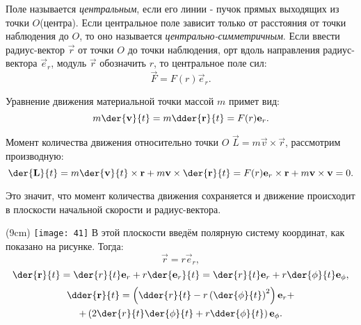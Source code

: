 

Поле называется \textit{центральным}, если его линии - пучок прямых выходящих
из точки \( O \)(центра). Если центральное поле зависит только от расстояния от
точки наблюдения до \( O \), то оно называется \textit{центрально-симметричным}.
Если ввести радиус-вектор \( \vec{r} \) от точки \( O \) до точки наблюдения,
орт вдоль направления радиус-вектора \( \vec{e}_r \), модуль \( \vec{r} \)
обозначить \( r \), то центральное поле сил:
\[
    \vec{F} = F(r)\vec{e}_{r}.
\]

Уравнение движения материальной точки массой \( m \) примет вид: 
\[
    m\der{\vec{v}}{t} = m\dder{\vec{r}}{t} = F(r)\vec{e}_{r}.
\]
    
Момент количества движения относительно точки \( O \)
\( \vec{L} = m \vec{v} \times \vec{r} \), рассмотрим производную:
\[
    \der{\vec{L}}{t} = 
    m \der{\vec{v}}{t} \times \vec{r} + m \vec{v} \times \der{\vec{r}}{t} =
    F(r)\vec{e}_{r} \times \vec{r} + m \vec{v} \times \vec{v} = 0.
\]
    
Это значит, что момент количества движения сохраняется и движение происходит в
плоскости начальной скорости и радиус-вектора.

\sidefig(9cm)
{\texttt{[image: 41]}}{
В этой плоскости введём полярную систему координат, как показано на рисунке.
Тогда:
\[
    \vec{r} = r \vec{e}_{r},
\]
\[
    \der{\vec{r}}{t} = 
    \der{r}{t} \vec{e}_{r} + 
    r \der{\vec{e}_{r}}{t} =
    \der{r}{t} \vec{e}_{r} + 
    r \der{\phi}{t}\vec{e}_{\phi},
\]
\begin{gather*}
    \dder{\vec{r}}{t} = 
    \left(
        \dder{r}{t} - 
        r
        \left(
        \der{\phi}{t}
        \right)^2
    \right)\vec{e}_{r} + \\ +
    \left( 
        2\der{r}{t} \der{\phi}{t}+ 
        r \dder{\phi}{t}
    \right)\vec{e}_{\phi}.
\end{gather*}
}


